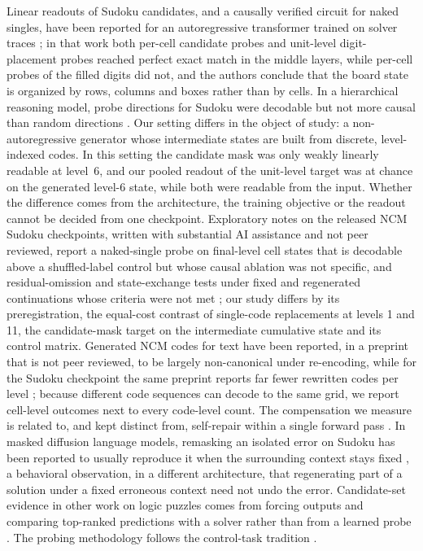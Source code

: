 Linear readouts of Sudoku candidates, and a causally verified circuit for naked singles, have been reported for an autoregressive transformer trained on solver traces \citep{kniazev2026linear}; in that work both per-cell candidate probes and unit-level digit-placement probes reached perfect exact match in the middle layers, while per-cell probes of the filled digits did not, and the authors conclude that the board state is organized by rows, columns and boxes rather than by cells. In a hierarchical reasoning model, probe directions for Sudoku were decodable but not more causal than random directions \citep{rodrigues2026hrm}. Our setting differs in the object of study: a non-autoregressive generator whose intermediate states are built from discrete, level-indexed codes. In this setting the candidate mask was only weakly linearly readable at level~6, and our pooled readout of the unit-level target was at chance on the generated level-6 state, while both were readable from the input. Whether the difference comes from the architecture, the training objective or the readout cannot be decided from one checkpoint. Exploratory notes on the released NCM Sudoku checkpoints, written with substantial AI assistance and not peer reviewed, report a naked-single probe on final-level cell states that is decodable above a shuffled-label control but whose causal ablation was not specific, and residual-omission and state-exchange tests under fixed and regenerated continuations whose criteria were not met \citep{quantix2026ncmnotes}; our study differs by its preregistration, the equal-cost contrast of single-code replacements at levels 1 and 11, the candidate-mask target on the intermediate cumulative state and its control matrix. Generated NCM codes for text have been reported, in a preprint that is not peer reviewed, to be largely non-canonical under re-encoding, while for the Sudoku checkpoint the same preprint reports far fewer rewritten codes per level \citep{khoury2026roundtrip}; because different code sequences can decode to the same grid, we report cell-level outcomes next to every code-level count. The compensation we measure is related to, and kept distinct from, self-repair within a single forward pass \citep{ahmad2026dose}. In masked diffusion language models, remasking an isolated error on Sudoku has been reported to usually reproduce it when the surrounding context stays fixed \citep{oh2026regenerate}, a behavioral observation, in a different architecture, that regenerating part of a solution under a fixed erroneous context need not undo the error. Candidate-set evidence in other work on logic puzzles comes from forcing outputs and comparing top-ranked predictions with a solver rather than from a learned probe \citep{shah2024logic}. The probing methodology follows the control-task tradition \citep{hewitt2019control,belinkov2022probing}.


